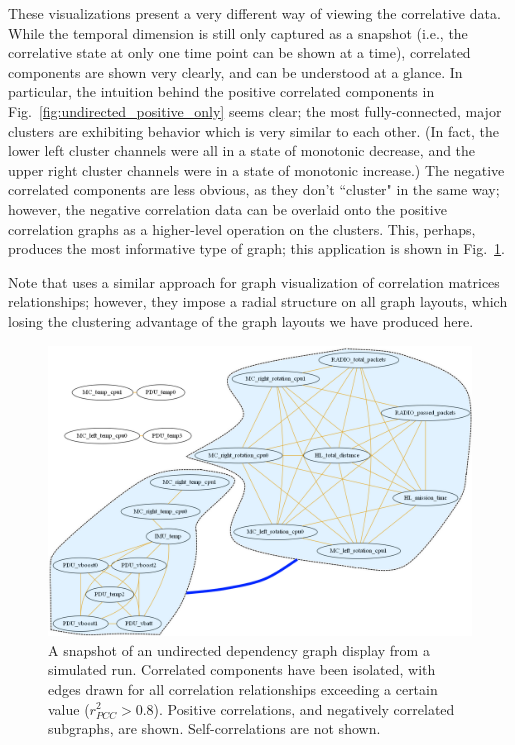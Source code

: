 These visualizations present a very different way of viewing the correlative data. While the temporal dimension is still only captured as a snapshot (i.e., the correlative state at only one time point can be shown at a time), correlated components are shown very clearly, and can be understood at a glance. In particular, the intuition behind the positive correlated components in Fig.~\ref{fig:undirected_positive_only} seems clear; the most fully-connected, major clusters are exhibiting behavior which is very similar to each other. (In fact, the lower left cluster channels were all in a state of monotonic decrease, and the upper right cluster channels were in a state of monotonic increase.) The negative correlated components are less obvious, as they don't ``cluster" in the same way; however, the negative correlation data can be overlaid onto the positive correlation graphs as a higher-level operation on the clusters. This, perhaps, produces the most informative type of graph; this application is shown in Fig.~\ref{fig:undirected_positive_with_negative_clusters}.

Note that \cite{yeh2007exploratory} uses a similar approach for graph visualization of correlation matrices relationships; however, they impose a radial structure on all graph layouts, which losing the clustering advantage of the graph layouts we have produced here.

\begin{figure}[h]
\centering
    \includegraphics[width=\columnwidth]{images/undirected_positive_with_negative_clusters.png}
    \caption{A snapshot of an undirected dependency graph display from a simulated run. Correlated components have been isolated, with edges drawn for all correlation relationships exceeding a certain value ($r_{PCC}^{2} > 0.8$). Positive correlations, and negatively correlated subgraphs, are shown. Self-correlations are not shown.}
    \label{fig:undirected_positive_with_negative_clusters}
\end{figure}

